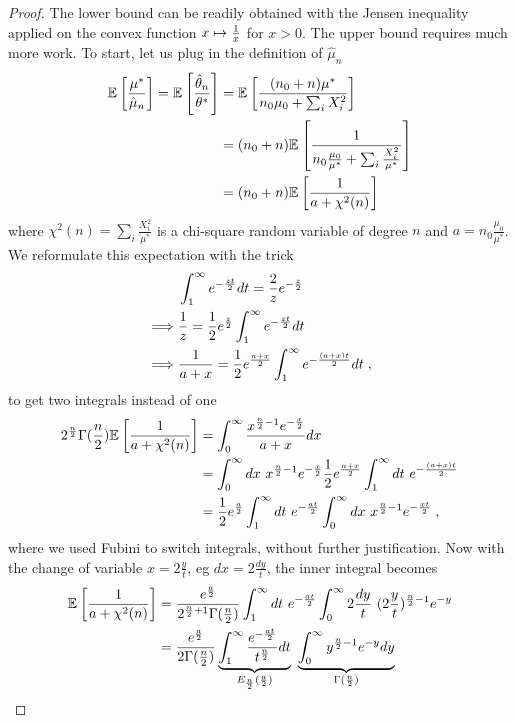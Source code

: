 \documentclass{article}
\newcommand*{\expect}[2][]{\ensuremath{\mathbb{E}_{#1} \left[ #2 \right] }} %
\newcommand{\nat}{\theta}
\newcommand{\MAPm}{\hat \mu_n}
\newcommand{\MAPt}{\hat \nat_n}
\begin{document}
\begin{proof}
	The lower bound can be readily obtained with the Jensen inequality applied on the convex function $x\mapsto\inv{x}$ for $x>0$.
	The upper bound requires much more work.
	To start, let us plug in the definition of $\MAPm$
	\begin{align}
		\expect{\frac{\mu^*}{\MAPm}} 
		= \expect{\frac{\MAPt}{\nat^*}} 
		&= \expect{\frac{(n_0+n) \mu^*}{n_0 \mu_0 + \sum_i X_i^2}}  \\
		&= (n_0 + n) \expect{\inv{n_0 \frac{\mu_0}{\mu^*}+ \sum_i \frac{X_i^2}{ \mu^*} }} \\
		&= (n_0 +n) \expect{\inv{a + \chi^2(n)}}
	\end{align}
	where $\chi^2(n) = \sum_i \frac{X_i^2}{ \mu^*}$ is a chi-square random variable of degree $n$ and $a=n_0 \frac{\mu_0}{\mu^*}$.
	We reformulate this expectation with the trick
	\begin{align}
		&\int_1^\infty e^{-\frac{zt}{2}} dt = \frac{2}{z} e^{-\half[z]} \\
		\implies &\inv{z} = \half e^{\half[z]} \int_1^\infty e^{-\frac{zt}{2}} dt \\
		\implies &\inv{a+x} = \half e^{\frac{a+x}{2}} \int_1^\infty e^{- \frac{(a+x)t}{2}}dt \; ,
	\end{align} 
	to get two integrals instead of one
	\begin{align}
		2^{\half[n]}\Gamma(\half[n]) \expect{\inv{a + \chi^2(n)}}  
		&= \int_0^\infty \frac{x^{\frac{n}{2}-1}e^{-\half[x]} }{a+x} dx \\
		&= \int_0^\infty dx\  x^{\frac{n}{2}-1}e^{-\half[x]} \half e^{\half[a+x]} \int_1^\infty  dt\  e^{-\half[(a+x)t]}  \\
		&= \half e^{\half[a]} \int_1^\infty dt \ e^{-\half[a t]}   \int_0^\infty dx \  x^{\frac{n}{2}-1} e^{-\half[x t]}  \; ,
	\end{align}
	where we used Fubini to switch integrals, without further justification.
	Now with the change of variable $x = 2\frac{y}{t}$, eg $dx = 2\frac{dy}{t}$, the inner integral becomes
	\begin{align}
		\expect{\inv{a + \chi^2(n)}}  
		&= \frac{e^{\half[a]} }{2^{\half[n]+1}\Gamma(\half[n]) }\int_1^\infty dt \ e^{-\half[a t]}   \int_0^\infty 2\frac{dy}{t} \  (2\frac{y}{t})^{\frac{n}{2}-1} e^{-y} \\
		&= \frac{e^{\half[a]} }{2\Gamma(\half[n]) } 
		\underbrace{\int_1^\infty  \frac{e^{-\half[a t]}}{t^{\frac{n}{2}}}  dt}_{E_{\half[n]}(\half[a])  } \ 
		\underbrace{\int_0^\infty  y^{\frac{n}{2}-1} e^{-y} dy}_{\Gamma(\half[n])}

\end{align}
\end{proof}
\end{document}
